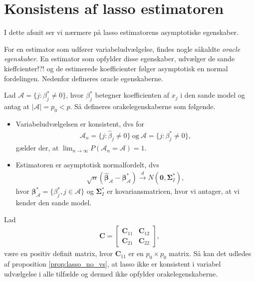 \section{Konsistens af lasso estimatoren}
I dette afsnit ser vi nærmere på lasso estimatorens asymptotiske egenskaber.

For en estimator som udfører variabeludvælgelse, findes nogle såkaldte \textit{oracle egenskaber}.
En estimator som opfylder disse egenskaber, udvælger de sande kieffcienter!?! og de estimerede koefficienter følger asymptotisk en normal fordelingen.
Nedenfor defineres oracle egenskaberne.
 
Lad $\mathcal{A} =\{j:\beta_j^* \neq 0\}$, hvor $\beta_j^*$ betegner koefficienten af $x_j$ i den sande model og antag at $\vert \mathcal{A} \vert=p_0 <p$. Så defineres orakelegenskaberne som følgende. 
\begin{defn}[Orakelegenskaber]
\begin{itemize}
\item Variabeludvælgelsen er konsistent, dvs for
\begin{align*}
\mathcal{A}_n=\lbrace j :\hat{\beta}_j \neq 0 \rbrace \ \text{og} \ \mathcal{A} =\{j:\beta_j^* \neq 0\},
\end{align*}
gælder der, at $\lim_{n \rightarrow \infty }P(\mathcal{A}_n=\mathcal{A})=1$.
\item Estimatoren er asymptotisk normalfordelt, dvs
\begin{align*}
\sqrt{n}(\hat{\boldsymbol{\beta}}_\mathcal{A}-\boldsymbol{\beta}^*_\mathcal{A}) \overset{d}{\rightarrow} N(\mathbf{0}, \boldsymbol{\Sigma}^*_I),
\end{align*}
hvor $\boldsymbol{\beta}^*_\mathcal{A}=\{ \beta_j^*, j \in \mathcal{A} \}$ og $\boldsymbol{\Sigma}^*_I$ er kovariansmatricen, hvor vi antager, at vi kender den sande model.
\end{itemize}
\end{defn}

%
Lad  
\begin{align*}
\textbf{C} = 
\begin{bmatrix}
\textbf{C}_{11}& \textbf{C}_{12}\\
\textbf{C}_{21}& \textbf{C}_{22}
\end{bmatrix},
\end{align*}
være en positiv definit matrix, hvor $\textbf{C}_{11}$ er en $p_0 \times p_0$ matrix. Så kan det udledes af proposition \ref{prop:lasso_no_vs}, at lasso ikke er konsistent i variabel udvælgelse i alle tilfælde og dermed ikke opfylder orakelegenskaberne.


